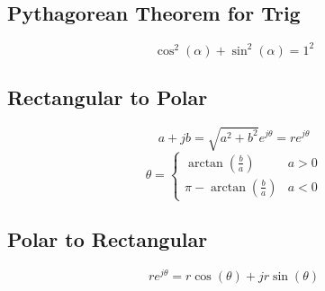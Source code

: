 \subsection{Pythagorean Theorem for Trig}\label{subsec:Pythagorean Theorem for Trig}
\begin{equation}\label{eq:Pythagorean Theorem for Trig}
  \cos^{2} \left( \alpha \right) + \sin^{2} \left( \alpha \right) = 1^{2}
\end{equation}

\subsection{Rectangular to Polar}\label{subsec:Rectangular to Polar}
\begin{equation}\label{eq:Rectangular to Polar-Magnitude}
  a + j b = \sqrt{a^{2}+b^{2}} e^{j \theta} = re^{j \theta}
\end{equation}
\begin{equation}\label{eq:Rectangular to Polar-Angle}
  \theta = \begin{cases}
    \arctan \left( \frac{b}{a} \right) & a>0 \\
    \pi - \arctan \left( \frac{b}{a} \right) & a<0
  \end{cases}
\end{equation}

\subsection{Polar to Rectangular}\label{subsec:Polar to Rectangular}
\begin{equation}\label{eq:Polar to Rectangular}
  re^{j \theta} = r \cos \left( \theta \right) + j r \sin \left( \theta \right)
\end{equation}